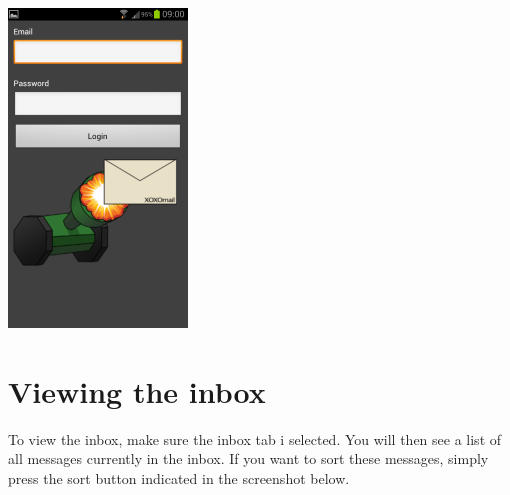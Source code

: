   \begin{center}
    \includegraphics{logingui1}
  \end{center}
  \newpage
  
\section*{Viewing the inbox}
To view the inbox, make sure the inbox tab i selected. You will then see a list of all messages currently in the inbox. If you want to sort these messages, simply press the sort button indicated in the screenshot below.   

